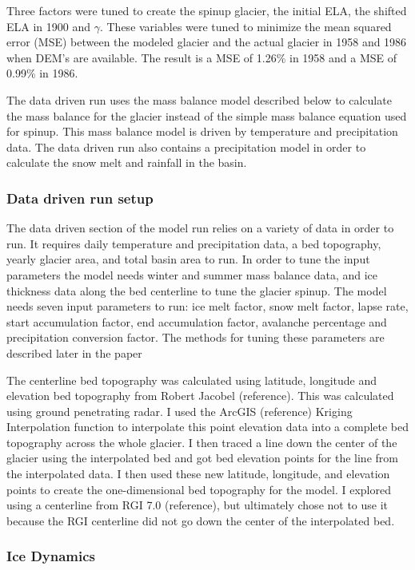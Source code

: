 \documentclass{article}
\begin{document}
Three factors were tuned to create the spinup glacier, the initial ELA, the shifted ELA in 1900 and $\gamma$. These variables were tuned to 
minimize the mean squared error (MSE) between the modeled glacier and the actual glacier in 1958 and 1986 when DEM's are available. The result is 
a MSE of 1.26\% in 1958 and a MSE of 0.99\% in 1986.

The data driven run uses the mass balance model described below to calculate the mass balance for the glacier instead of the simple mass balance 
equation used for spinup. This mass balance model is driven by temperature and precipitation data. The data driven run also contains a precipitation 
model in order to calculate the snow melt and rainfall in the basin.

\subsubsection{Data driven run setup}
The data driven section of the model run relies on a variety of data in order to run. It requires daily temperature and precipitation data, 
a bed topography, yearly glacier area, and total basin area to run. In order to tune the input parameters the model needs winter and summer mass balance 
data, and ice thickness data along the bed centerline to tune the glacier spinup. The model needs seven input parameters to run: ice melt factor, 
snow melt factor, lapse rate, start accumulation factor, end 
accumulation factor, avalanche percentage and precipitation conversion factor. The methods for tuning these parameters are described later in the paper

The centerline bed topography was calculated using latitude, longitude and elevation bed topography from Robert Jacobel (reference). This  was calculated using 
ground penetrating radar. I used the ArcGIS (reference) Kriging Interpolation function to interpolate this point elevation data into a complete 
bed topography across the whole glacier. I then traced a line down the center of the glacier using the interpolated bed and got bed elevation points for the line 
from the interpolated data. I then used these new latitude, longitude, and elevation points to create the one-dimensional bed topography for 
the model. I explored using a centerline from RGI 7.0 (reference), but ultimately chose not to use it because the RGI centerline did not go 
down the center of the interpolated bed.

\subsubsection{Ice Dynamics}
\end{document}

